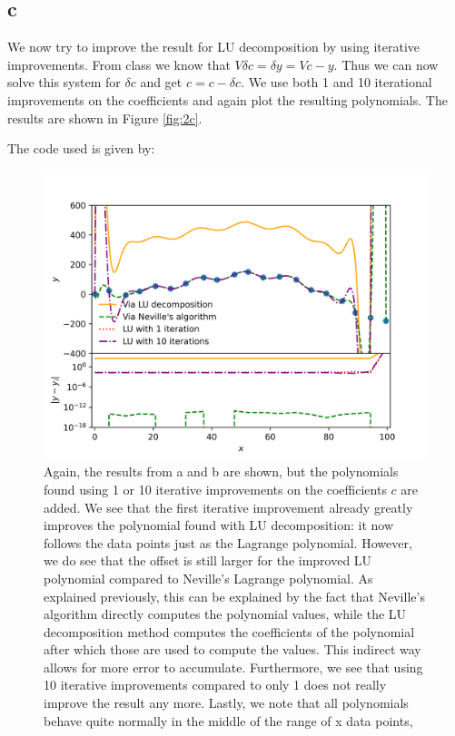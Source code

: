 \subsection{c}

We now try to improve the result for LU decomposition by using iterative improvements. From class we know that
$V\delta c=\delta y=Vc-y$. Thus we can now solve this system for $\delta c$ and get $c=c-\delta c$. We use both 1 and 10 iterational improvements on the coefficients and again plot the resulting polynomials.
The results are shown in Figure \ref{fig:2c}.

The code used is given by:


\begin{figure}[h!]
    \centering
    \includegraphics[width=0.9\linewidth]{./my_vandermonde_sol_2c.png}
    \caption{Again, the results from a and b are shown, but the polynomials found using 1 or 10 iterative improvements on the coefficients $c$ are added.
    We see that the first iterative improvement already greatly improves the polynomial found with LU decomposition: it now follows the data points just as the Lagrange polynomial.
    However, we do see that the offset is still larger for the improved LU polynomial compared to Neville's Lagrange polynomial. As explained previously, this can be explained by the fact that Neville's algorithm directly computes the 
    polynomial values, while the LU decomposition method computes the coefficients of the polynomial after which those are used to compute the values. This indirect way allows for more error to accumulate.
    Furthermore, we see that using 10 iterative improvements compared to only 1 does not really improve the result any more. Lastly, we note that all polynomials behave quite normally in the middle of the range of x data points,
}
\end{figure}
